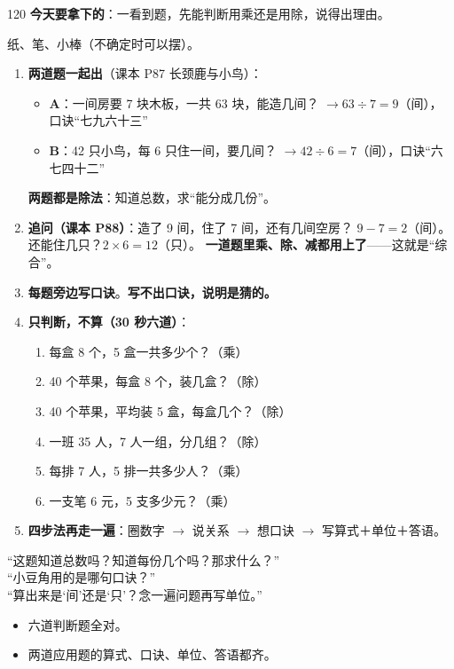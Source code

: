\begin{lesson}{1}{20}
\textbf{今天要拿下的}：一看到题，先能判断用乘还是用除，说得出理由。

\begin{materials}
纸、笔、小棒（不确定时可以摆）。
\end{materials}

\begin{enumerate}
  \item \textbf{两道题一起出}（课本 P87 长颈鹿与小鸟）：
        \begin{itemize}
          \item \textbf{A}：一间房要 7 块木板，一共 63 块，能造几间？
                $\to 63\div7=9$（间），口诀“七九六十三”
          \item \textbf{B}：42 只小鸟，每 6 只住一间，要几间？
                $\to 42\div6=7$（间），口诀“六七四十二”
        \end{itemize}
        \textbf{两题都是除法}：知道总数，求“能分成几份”。
  \item \textbf{追问（课本 P88）}：造了 9 间，住了 7 间，还有几间空房？
        $9-7=2$（间）。还能住几只？$2\times6=12$（只）。
        \textbf{一道题里乘、除、减都用上了}——这就是“综合”。
  \item \textbf{每题旁边写口诀}。\textbf{写不出口诀，说明是猜的。}
  \item \textbf{只判断，不算（30 秒六道）}：
        \begin{enumerate}[label=（\arabic*）,itemsep=2pt]
          \item 每盒 8 个，5 盒一共多少个？（乘）
          \item 40 个苹果，每盒 8 个，装几盒？（除）
          \item 40 个苹果，平均装 5 盒，每盒几个？（除）
          \item 一班 35 人，7 人一组，分几组？（除）
          \item 每排 7 人，5 排一共多少人？（乘）
          \item 一支笔 6 元，5 支多少元？（乘）
        \end{enumerate}
  \item \textbf{四步法再走一遍}：圈数字 $\to$ 说关系 $\to$ 想口诀 $\to$
        写算式＋单位＋答语。
\end{enumerate}

\begin{saybox}
“这题知道总数吗？知道每份几个吗？那求什么？”\\
“小豆角用的是哪句口诀？”\\
“算出来是‘间’还是‘只’？念一遍问题再写单位。”
\end{saybox}

\begin{passbox}
\begin{itemize}
  \item 六道判断题全对。
  \item 两道应用题的算式、口诀、单位、答语都齐。
\end{itemize}
\end{passbox}
\end{lesson}

